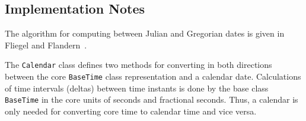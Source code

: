 
\subsection{Implementation Notes}

The algorithm for computing between Julian and Gregorian dates is given 
in Fliegel and Flandern~\cite{Fli68}.

The {\tt Calendar} class defines two methods for converting in both
directions between the core {\tt BaseTime} class representation and a
calendar date.  Calculations of time intervals (deltas) between
time instants is done by the base class {\tt BaseTime} in the core units
of seconds and fractional seconds.  Thus,  a calendar is only needed for
converting core time to calendar time and vice versa.
